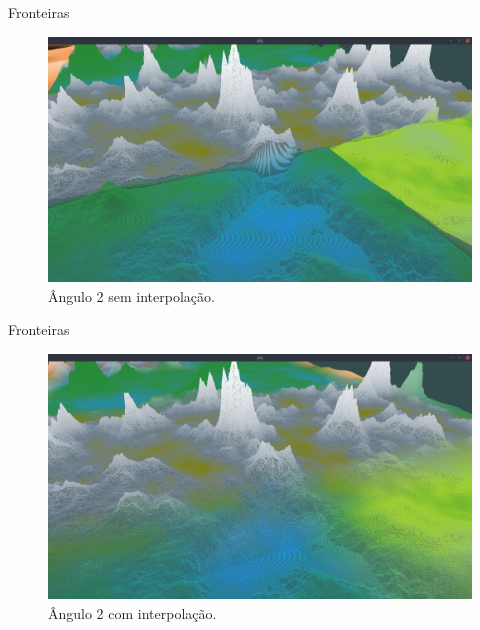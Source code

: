 \begin{frame}{Fronteiras}
    \begin{figure}[H]
        \centering
        \includegraphics[width=.9\textwidth]{img/border/a9/2s.png}
        \caption{Ângulo 2 sem interpolação.}
        \label{fig:img_border_a9_2s}
    \end{figure}
    
\end{frame}


\begin{frame}{Fronteiras}
    \begin{figure}[H]
        \centering
        \includegraphics[width=.9\textwidth]{img/border/a9/2c.png}
        \caption{Ângulo 2 com interpolação.}
        \label{fig:img_border_a9_2c}
    \end{figure}
    
\end{frame}

